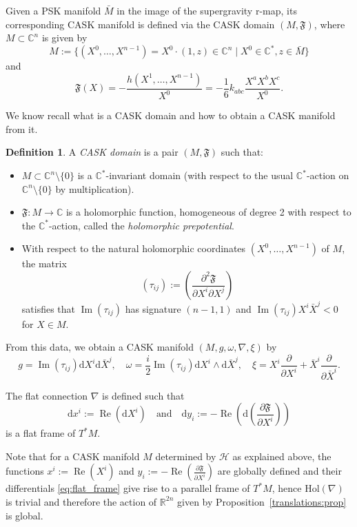 \documentclass{article}
\theoremstyle{definition}
\newtheorem{definition}[theorem]{Definition}
\newcommand{\R}{\mathbb{R}}
\newcommand{\C}{\mathbb{C}}
\newcommand{\calH}{\mathcal{H}}
\renewcommand{\Re}{\operatorname{Re}}
\renewcommand{\Im}{\operatorname{Im}}
\newcommand{\pd}[2]{\frac{\partial #1}{\partial #2}}
\renewcommand{\d}{\mathrm{d}}
\begin{document}
    Given a PSK manifold $\bar M$ in the image of the supergravity r-map, its corresponding CASK manifold is defined via the CASK domain $(M,\mathfrak{F})$, where $M\subset\C^n$ is given by $$M:=\{(X^0,\ldots,X^{n-1})=X^0\cdot(1,z)\in\C^n\mid X^0\in\C^*,z\in\bar{M}\}$$ and $$\mathfrak{F}(X)=-\frac{h(X^1,\ldots,X^{n-1})}{X^0}=-\frac{1}{6}k_{abc}\frac{X^aX^bX^c}{X^0}.$$
    
    We know recall what is a CASK domain and how to obtain a CASK manifold from it.
    
    \begin{definition}
		A \emph{CASK domain} is a pair $(M,\mathfrak{F})$ such that: \begin{itemize}
			\itemsep 0em
			\item $M\subset\C^n\setminus\{0\}$ is a $\C^*$-invariant domain (with respect to the usual $\C^*$-action on $\C^n\setminus\{0\}$ by multiplication).
			\item $\mathfrak{F}:M\longrightarrow\C$ is a holomorphic function, homogeneous of degree 2 with respect to the $\C^*$-action, called the \emph{holomorphic prepotential}.
			\item With respect to the natural holomorphic coordinates $(X^0,\ldots,X^{n-1})$ of $M$, the matrix $$(\tau_{ij}):=\left(\frac{\partial^2\mathfrak{F}}{\partial X^i\partial X^j}\right)$$ satisfies that $\Im(\tau_{ij})$ has signature $(n-1,1)$ and $\Im(\tau_{ij})X^i\bar{X}^j<0$ for $X\in M$.
		\end{itemize}
	\end{definition}

	From this data, we obtain a CASK manifold $(M,g,\omega,\nabla,\xi)$ by $$g=\Im(\tau_{ij})\d X^i\d\bar{X}^j,\quad\omega=\frac{i}{2}\Im(\tau_{ij})\d X^i\wedge\d\bar{X}^j,\quad\xi=X^i\pd{}{X^i}+\bar{X}^i\pd{}{\bar{X}^i}.$$
 
    The flat connection $\nabla$ is defined such that \begin{equation}\label{eq:flat_frame}
	    \d x^i:=\Re(\d X^i)\quad\text{and}\quad\d y_i:=-\Re(\d(\pd{\mathfrak{F}}{X^i}))
     \end{equation} is a flat frame of $T^*M$.\medskip
     
     Note that for a CASK manifold $M$ determined by $\calH$ as explained above, the functions $x^i:=\Re(X^i)$ and $y_i:=-\Re(\pd{\mathfrak{F}}{X^i})$ are globally defined and their differentials \eqref{eq:flat_frame} give rise to a parallel frame of $T^*M$, hence $\mathrm{Hol}(\nabla)$ is trivial and therefore the action of $\R^{2n}$ given by Proposition~\ref{translations:prop} is global.\medskip
     
\end{document}
